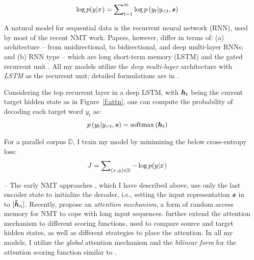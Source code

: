 \begin{equation}
\log p(y_{}|x_{}) = \sum_{t=1}^m \nolimits \log
p\left(y_{t}|y_{<t},\mbox{\boldmath{$s$}}\right)
\label{e:s2s}
\end{equation}

A natural model for sequential data is the recurrent
neural network (RNN), used by most of the recent NMT work.
Papers, however, differ in terms of: (a) architecture -- from unidirectional, to
bidirectional, and deep multi-layer RNNs; and (b) RNN type -- which are long
short-term memory (LSTM)
\cite{lstm97} and the gated recurrent unit \cite{cho14}. 
All my models utilize the {\it deep multi-layer} architecture with {\it
LSTM} as the recurrent unit; detailed formulations are in \cite{zaremba14}.

Considering the top recurrent layer in a deep LSTM, 
with $\mbox{\boldmath{$h$}}_{t}$ being the current target hidden state as in Figure~\ref{f:attn}, one can compute the probability of decoding each target word $y_t$ as:
\begin{equation}
p\left(y_{t}|y_{<t},\mbox{\boldmath{$s$}}\right) = \operatorname{softmax}\left(\mbox{\boldmath{$h$}}_{t}\right)
\label{e:softmax}
\end{equation}

For a parallel corpus $\mathbb{D}$, I train my model by minimizing the below
cross-entropy loss:
\begin{equation}
J = \sum_{(x_{},y_{}) \in \mathbb{D}} \nolimits -\log p(y_{}|x_{})
\label{e:obj}
\end{equation}

 -- 
The early NMT approaches \cite{sutskever14,cho14}, which I have described above, use only the last encoder state
 to initialize the decoder, i.e., setting the input representation $\mbox{\boldmath{$s$}}$ in
  to $[\mbox{\boldmath{$\bar{h}$}}_{n}]$. Recently,  propose an {\it attention
 mechanism}, a form of random access memory for NMT to 
cope with long input sequences.
 further extend the attention mechanism to different
scoring functions, used to compare source and target
hidden states, as well as different
strategies to place the attention.
In all my models, I utilize the {\it global} attention mechanism and the {\it
bilinear form} for the attention scoring function similar to 
\cite{luong15attn}.

